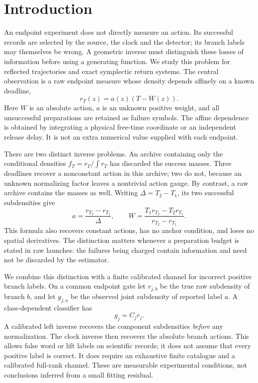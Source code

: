 \section{Introduction}
\label{sec:v78-introduction}\label{sec:v80-introduction}

An endpoint experiment does not directly measure an action.  Its
successful records are selected by the source, the clock and the
detector; its branch labels may themselves be wrong.  A geometric
inverse must distinguish these losses of information before using a
generating function.  We study this problem for reflected trajectories
and exact symplectic return systems.  The central observation is a
raw endpoint measure whose density depends affinely on a known deadline,
\begin{equation}\label{eq:v80-intro-pencil}
                       r_T(z)=a(z)(T-W(z)).
\end{equation}
Here $W$ is an absolute action, $a$ is an unknown positive weight, and
all unsuccessful preparations are retained as failure symbols.
The affine dependence is obtained by integrating a physical free-time
coordinate or an independent release delay.  It is not an extra
numerical value supplied with each endpoint.

There are two distinct inverse problems.  An archive containing only
the conditional densities $f_T=r_T/\int r_T$ has discarded the success
masses.  Three deadlines recover a nonconstant action in this archive;
two do not, because an unknown normalizing factor leaves a nontrivial
action gauge.  By contrast, a raw archive contains the masses as well.
Writing $\Delta=T_2-T_1$, its two successful subdensities give
\begin{equation}\label{eq:v80-intro-inverse}
 a=\frac{r_{T_2}-r_{T_1}}{\Delta},\qquad
 W=\frac{T_1r_{T_2}-T_2r_{T_1}}{r_{T_2}-r_{T_1}}.
\end{equation}
This formula also recovers constant actions, has no anchor condition,
and loses no spatial derivatives.  The distinction matters whenever
a preparation budget is stated in raw launches: the failures being
charged contain information and need not be discarded by the estimator.

We combine this distinction with a finite calibrated channel for
incorrect positive branch labels.  On a common endpoint gate let
$r_{j,b}$ be the true raw subdensity of branch $b$, and let $g_{j,a}$
be the observed joint subdensity of reported label $a$.  A
class-dependent classifier has
\begin{equation}\label{eq:v80-intro-channel}
                  g_j=C_j r_j.
\end{equation}
A calibrated left inverse recovers the component subdensities
\emph{before} any normalization.  The clock inverse then recovers the
absolute branch actions.  This allows false word or lift labels on
scientific records; it does not assume that every positive label is
correct.  It does require an exhaustive finite catalogue and a
calibrated full-rank channel.  These are measurable experimental
conditions, not conclusions inferred from a small fitting residual.


